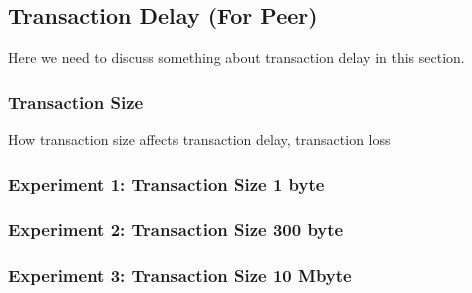 \documentclass[10pt,journal,compsoc, twoside]{IEEEtran}
\begin{document}
%
%
%





\subsection{Transaction Delay (For Peer)}
 
Here we need to discuss something about transaction delay in this section. 


\subsubsection{Transaction Size}

How transaction size affects transaction delay, transaction loss

\subsubsection{Experiment 1: Transaction Size 1 byte}



\subsubsection{Experiment 2: Transaction Size 300 byte}



\subsubsection{Experiment 3: Transaction Size 10 Mbyte}
\end{document}
